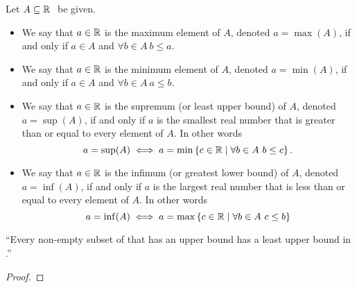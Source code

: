         \begin{definition}
            Let $A \subseteq \mathbb{R} \ $ be given.
            \begin{itemize}
                \item
                    We say that $a \in \mathbb{R}$ is the maximum element of $A$, denoted $a = \max(A)$,
                    if and only if $a \in A$ and $\forall b \in A \ b \le a$.
                \item
                    We say that $a \in \mathbb{R}$ is the minimum element of $A$, denoted $a = \min(A)$,
                    if and only if $a \in A$ and $\forall b \in A \ a \le b$.
                \item
                    We say that $a \in \mathbb{R}$ is the supremum (or least upper bound) of $A$, denoted
                    $a = \sup(A)$, if and only if $a$ is the smallest real number that is greater than
                    or equal to every element of $A$. In other words
                    \[
                        a = \sup(A) \iff a = \min\left\{c \in \mathbb{R} \mid \forall b \in A \ b \le c\right\}.
                    \]
                \item
                    We say that $a \in \mathbb{R}$ is the infimum (or greatest lower bound) of $A$, denoted
                    $a = \inf(A)$, if and only if $a$ is the largest real number that is less than or
                    equal to every element of $A$. In other words
                    \[
                        a = \inf(A) \iff a = \max\left\{c \in \mathbb{R} \mid \forall b \in A \ c \le b\right\}
                    \]
            \end{itemize}
        \end{definition}
        \begin{theorem}
            ``Every non-empty subset of  that has an upper bound has a least upper bound
            in .''
        \end{theorem}
        \begin{proof}
        \end{proof}
